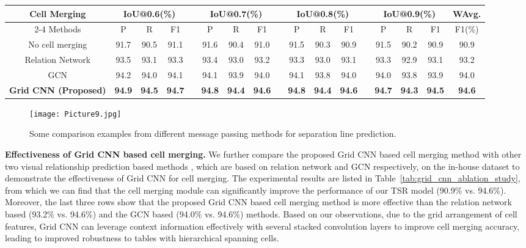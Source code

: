 \documentclass[final,3p,times,twocolumn]{elsarticle}
\begin{document}
\begin{table*}[t]
    \setlength{\tabcolsep}{4.5pt}
    \footnotesize
    \centering
    \caption{Comparison of different cell merging methods.}
    \label{tab:grid_cnn_ablation_study}
    \begin{tabular}{ c  c  c  c  c  c  c  c  c  c  c  c  c  c  c  c  c}
        \toprule
        Cell Merging & \multicolumn{3}{c}{IoU@0.6(\%)} && \multicolumn{3}{c}{IoU@0.7(\%)} &&
        \multicolumn{3}{c}{IoU@0.8(\%)} &&
        \multicolumn{3}{c}{IoU@0.9(\%)} & WAvg. \\\cline{2-4}\cline{6-8}\cline{10-12}\cline{14-16}
        Methods & P & R & F1 && P & R & F1 && P & R & F1 && P & R & F1 & F1(\%)\\
        \midrule
        No cell merging & 91.7 & 90.5 & 91.1 && 91.6 & 90.4 & 91.0 && 91.5 & 90.3 & 90.9 && 91.5 & 90.2 & 90.9 & 90.9 \\
        Relation Network \cite{ma2021relatext} & 93.5 & 93.1 & 93.3 && 93.4 & 93.0 & 93.2 && 93.3 & 93.0 & 93.1 && 93.3 & 92.9 & 93.1 & 93.2 \\
        GCN \cite{ma2021relatext} & 94.2 & 94.0 & 94.1 && 94.1 & 93.9 & 94.0 && 94.1 & 93.8 & 94.0 && 94.0 & 93.8 & 93.9 & 94.0 \\
        \textbf{Grid CNN (Proposed)} & \textbf{94.9} & \textbf{94.5} & \textbf{94.7} && \textbf{94.8} & \textbf{94.4} & \textbf{94.6} && \textbf{94.8} & \textbf{94.4} & \textbf{94.6} && \textbf{94.7} & \textbf{94.3} & \textbf{94.5} & \textbf{94.6} \\
        \bottomrule
    \end{tabular}
\end{table*}
\begin{figure}[h!]
    \centering
    \setlength{\abovecaptionskip}{-0.2cm}
    \texttt{[image: Picture9.jpg]}
    \caption{Some comparison examples from different message passing methods for separation line prediction.}
    \label{fig:scnn_demo}
\end{figure}

\textbf{Effectiveness of Grid CNN based cell merging.} We further compare the proposed Grid CNN based cell merging method with other two visual relationship prediction based methods \cite{ma2021relatext}, which are based on relation network and GCN respectively, on the in-house dataset to demonstrate the effectiveness of Grid CNN for cell merging. The experimental results are listed in Table~\ref{tab:grid_cnn_ablation_study}, from which we can find that the cell merging module can significantly improve the performance of our TSR model (90.9\% vs. 94.6\%). Moreover, the last three rows show that the proposed Grid CNN based cell merging method is more effective than the relation network based (93.2\% vs. 94.6\%) and the GCN based (94.0\% vs. 94.6\%) methods. Based on our observations, due to the grid arrangement of cell features, Grid CNN can leverage context information effectively with several stacked convolution layers to improve cell merging accuracy, leading to improved robustness to tables with hierarchical spanning cells.
\end{document}
